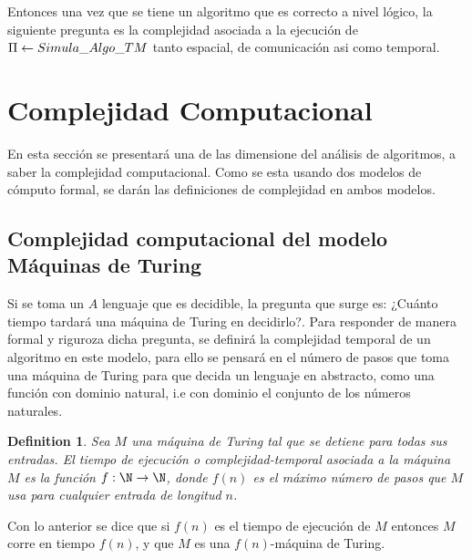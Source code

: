 \documentclass[10pt]{report}
\newtheorem{definition}{Definition}
\begin{document}
    Entonces una vez que se tiene un algoritmo que es correcto a nivel lógico,
    la siguiente pregunta es la complejidad asociada a la ejecución de $\Pi \gets Simula\char95Algo\char95TM$
    tanto espacial, de comunicación asi como temporal.
    \newpage
    \section{Complejidad Computacional}\label{sec:complejidad-computacional}
    En esta sección se presentará una de las dimensione del análisis de algoritmos, a saber la complejidad computacional.
    Como se esta usando dos modelos de cómputo formal, se darán las definiciones de complejidad en ambos modelos.

    \subsection{Complejidad computacional del modelo Máquinas de Turing}\label{subsec:complejidad-computacional-del-modelo-máquinas-de-turing}
    Si se toma un $A$ lenguaje que es decidible, la pregunta que surge es: ¿Cuánto tiempo tardará una máquina de Turing
    en decidirlo?.
    Para responder de manera formal y riguroza dicha pregunta, se definirá la complejidad temporal de un algoritmo
    en este modelo, para ello se pensará en el número de pasos que toma una máquina de Turing para que decida un lenguaje
    en abstracto, como una función con dominio natural, i.e con dominio el conjunto de los números naturales.

    \begin{definition}
        Sea $M$ una máquina de Turing tal que se detiene para todas sus entradas.\hfill
        El tiempo de ejecución o complejidad-temporal asociada a la máquina $M$ es la función
        $f:\N\rightarrow\N $, donde $f(n)$ es el máximo número de pasos que $M$ usa para cualquier entrada de
        longitud $n$.
    \end{definition}
    Con lo anterior se dice que si $f(n)$ es el tiempo de ejecución de $M$ entonces $M$ corre en tiempo $f(n)$,
    y que $M$ es una $f(n)$-máquina de Turing.
\end{document}
